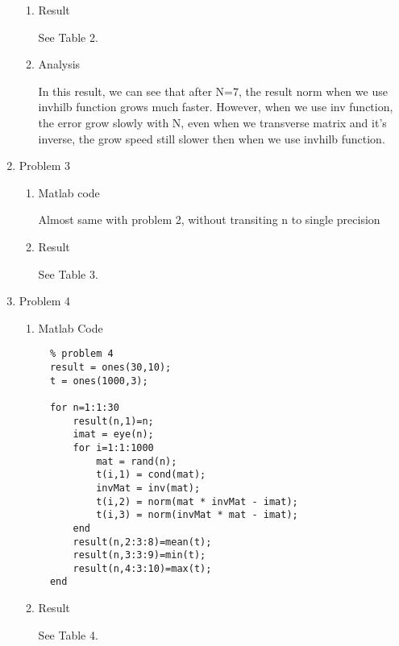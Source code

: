 \documentclass[12pt]{article}
\begin{document}
\begin{enumerate}
\begin{enumerate}
  \item Result
  
	See Table 2.
    
  \item Analysis
  
  In this result, we can see that after N=7, the result norm when we use invhilb function grows much faster. However, when we use inv function, the error grow slowly with N, even when we transverse matrix and it's inverse, the grow speed still slower then when we use invhilb function.
  \end{enumerate}

\item Problem 3
  \begin{enumerate}
  \item Matlab code

  Almost same with problem 2, without transiting n to single precision

  \item Result
  
	See Table 3.
  \end{enumerate}

\item Problem 4
  \begin{enumerate}
  \item Matlab Code

  \begin{lstlisting}
  % problem 4
  result = ones(30,10);
  t = ones(1000,3);

  for n=1:1:30
      result(n,1)=n;
      imat = eye(n);
      for i=1:1:1000
          mat = rand(n);
          t(i,1) = cond(mat);
          invMat = inv(mat);
          t(i,2) = norm(mat * invMat - imat);
          t(i,3) = norm(invMat * mat - imat);
      end
      result(n,2:3:8)=mean(t);
      result(n,3:3:9)=min(t);
      result(n,4:3:10)=max(t);
  end
  \end{lstlisting}

  \item Result
  
	See Table 4.
  \end{enumerate}
  \newpage
    

\end{enumerate}
\end{document}
